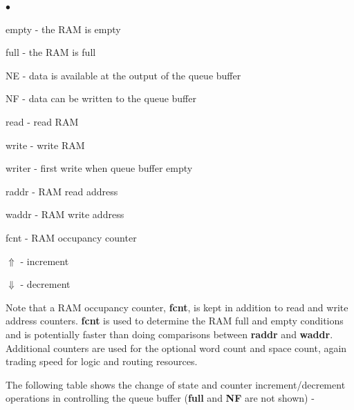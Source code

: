 \documentclass[10pt,a4paper,twoside,fleqn]{book}
\newcommand{\blist}{\begin{list}{$\bullet$}{\setlength{\itemsep}{-5pt}\setlength{\topsep}{-5pt}}}
\newcommand{\blend}{\end{list}}
\begin{document}
                    \blist
                    \item   empty - the RAM is empty
                    \item   full - the RAM is full
                    \item   NE - data is available at the output of the queue buffer
                    \item   NF - data can be written to the queue buffer
                    \item   read - read RAM
                    \item   write - write RAM
                    \item   writer - first write when queue buffer empty
                    \item   raddr - RAM read address
                    \item   waddr - RAM write address
                    \item   fcnt - RAM occupancy counter
                    \item   $\Uparrow$ - increment
                    \item   $\Downarrow$ - decrement
                    \blend
                    
                    Note that a RAM occupancy counter, {\bf fcnt}, is kept in
                    addition to read and write address counters. {\bf fcnt} is
                    used to determine the RAM full and empty conditions and is
                    potentially faster than doing comparisons between {\bf
                    raddr} and {\bf waddr}. Additional counters are used for the
                    optional word count and space count, again trading speed for
                    logic and routing resources.
                    
                    The following table shows the change of state and counter
                    increment/decrement operations in controlling the queue
                    buffer ({\bf full} and {\bf NF} are not shown) -
\end{document}
